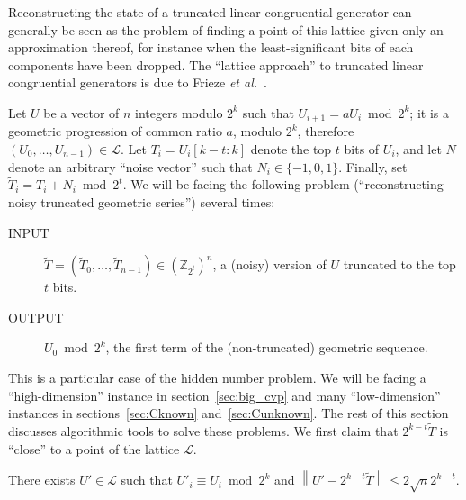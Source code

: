 \documentclass[submission,svgnames,journal=tosc]{iacrtrans}
\begin{document}
Reconstructing the state of a truncated linear congruential generator can
generally be seen as the problem of finding a point of this lattice given only
an approximation thereof, for instance when the least-significant bits of each
components have been dropped. The ``lattice approach'' to truncated linear
congruential generators is due to Frieze \textit{et al.}~\cite{Frieze}.

Let $U$ be a vector of $n$ integers modulo $2^k$ such that
$U_{i+1} = a U_i \bmod 2^k$; it is a geometric progression of common ratio $a$,
modulo $2^k$, therefore $(U_0, \dots, U_{n-1}) \in \mathcal{L}$. Let
$T_i = U_i[k-t:k]$ denote the top $t$ bits of $U_i$, and let $N$ denote an
arbitrary ``noise vector'' such that $N_i \in \{-1, 0, 1\}$. Finally, set
$\widetilde{T}_i = T_i + N_i \bmod 2^{t}$.  We will be facing the following
problem (``reconstructing noisy truncated geometric series'') several times:
\begin{description}
\item[INPUT]  $\widetilde{T} = (\widetilde{T}_0, \dots, \widetilde{T}_{n-1}) \in \left(\mathbb{Z}_{2^t}\right)^n$, a (noisy) version of $U$ truncated to the top $t$ bits.
\item[OUTPUT] $U_0 \bmod 2^k$, the first term of the (non-truncated) geometric sequence.
\end{description}

This is a particular case of the hidden number problem. We will be facing a ``high-dimension'' instance in section~\ref{sec:big_cvp}
and many ``low-dimension'' instances in sections~\ref{sec:Cknown}
and~\ref{sec:Cunknown}. The rest of this section discusses algorithmic tools to
solve these problems. We first claim that $2^{k-t} \widetilde{T}$ is
``close'' to a point of the lattice $\mathcal{L}$.

\begin{lemma}\label{thm:close}
  There exists $U' \in \mathcal{L}$ such that $U'_i \equiv U_i \bmod 2^k$
  and $\left\lVert U' -2^{k-t} \widetilde{T} \right\rVert \leq 2 \sqrt{n} 2^{k-t}$.
\end{lemma}
\end{document}
